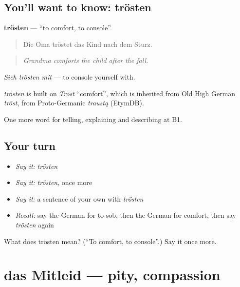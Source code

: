 \subsection*{You'll want to know: trösten}
\textbf{trösten} — \textquotedblleft{}to comfort, to console\textquotedblright{}.

\begin{quote}
Die Oma tröstet das Kind nach dem Sturz.
\end{quote}

\begin{quote}
\emph{Grandma comforts the child after the fall.}
\end{quote}

\emph{Sich trösten mit} — to console yourself with.

\begin{cousinweb}
\emph{trösten} is built on \emph{Trost} \textquotedblleft{}comfort\textquotedblright{}, which is inherited from Old High German \emph{trōst}, from Proto-Germanic \emph{traustą} (EtymDB).
\end{cousinweb}

\begin{grammarlens}[title={What you've built}]
One more word for telling, explaining and describing at B1.
\end{grammarlens}

\subsection*{Your turn}
\begin{itemize}
\raggedright
  \item \emph{Say it:} \emph{trösten}
  \item \emph{Say it:} \emph{trösten}, once more
  \item \emph{Say it:} a sentence of your own with \emph{trösten}
  \item \emph{Recall:} say the German for to sob, then the German for comfort, then say \emph{trösten} again
\end{itemize}

\begin{tcolorbox}[breakable,colback=teal!4,colframe=teal!35!black,title={Before you move on}]
What does trösten mean? (\textquotedblleft{}To comfort, to console\textquotedblright{}.) Say it once more.
\end{tcolorbox}
\section[das Mitleid]{das Mitleid — pity, compassion}

